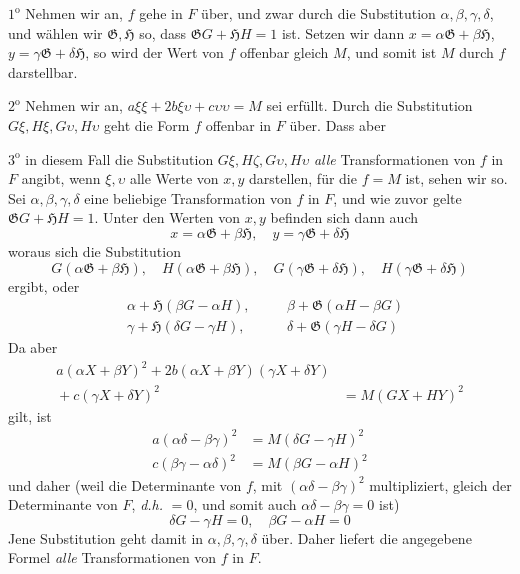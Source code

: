 $1^{\mathrm{o}}$ Nehmen wir an, $f$ gehe in $F$ über, und zwar durch die Substitution $\alpha,\beta,\gamma,\delta$, und wählen wir $\mathfrak{G},\mathfrak{H}$ so, dass $\mathfrak{G}G+\mathfrak{H}H=1$ ist. Setzen wir dann $x=\alpha\mathfrak{G}+\beta\mathfrak{H}$, $y=\gamma\mathfrak{G}+\delta\mathfrak{H}$, so wird der Wert von $f$ offenbar gleich $M$, und somit ist $M$ durch $f$ darstellbar.

$2^{\mathrm{o}}$ Nehmen wir an, $a\xi\xi+2b\xi\upsilon+c\upsilon\upsilon=M$ sei erfüllt. Durch die Substitution $G\xi,H\xi,G\upsilon,H\upsilon$ geht die Form $f$ offenbar in $F$ über. Dass aber

$3^{\mathrm{o}}$ in diesem Fall die Substitution $G\xi,H\zeta,G\upsilon,H\upsilon$ \textit{alle} Transformationen von $f$ in $F$ angibt, wenn $\xi,\upsilon$ alle Werte von $x,y$ darstellen, für die $f=M$ ist, sehen wir so. Sei $\alpha,\beta,\gamma,\delta$ eine beliebige Transformation von $f$ in $F$, und wie zuvor gelte $\mathfrak{G}G+\mathfrak{H}H=1$. Unter den Werten von $x,y$ befinden sich dann auch
\[
x=\alpha\mathfrak{G}+\beta\mathfrak{H},\quad y=\gamma\mathfrak{G}+\delta\mathfrak{H}
\]
woraus sich die Substitution
\[
G(\alpha\mathfrak{G}+\beta\mathfrak{H}),\quad H(\alpha\mathfrak{G}+\beta\mathfrak{H}),\quad G(\gamma\mathfrak{G}+\delta\mathfrak{H}),\quad H(\gamma\mathfrak{G}+\delta\mathfrak{H})
\]
ergibt, oder
\[
\begin{aligned}
&\alpha+\mathfrak{H}(\beta G-\alpha H), &\quad&\beta+\mathfrak{G}(\alpha H-\beta G)\\
&\gamma+\mathfrak{H}(\delta G-\gamma H), &&\delta+\mathfrak{G}(\gamma H-\delta G)
\end{aligned}
\]
Da aber
\[
\begin{aligned}a(\alpha X+\beta Y)^2+2b(\alpha X+\beta Y)(\gamma X+\delta Y)&{}\\
{}+c(\gamma X+\delta Y)^2&=M(GX+HY)^2\end{aligned}
\]
gilt, ist
\[
\begin{aligned}
a(\alpha\delta-\beta\gamma)^2&=M(\delta G-\gamma H)^2\\
c(\beta\gamma-\alpha\delta)^2&=M(\beta G-\alpha H)^2
\end{aligned}
\]
und daher (weil die Determinante von $f$, mit $(\alpha\delta-\beta\gamma)^2$ multipliziert, gleich der Determinante von $F$, \textit{d.h.} $=0$, und somit auch $\alpha\delta-\beta\gamma=0$ ist)
\[
\delta G-\gamma H=0,\quad \beta G-\alpha H=0
\]
Jene Substitution geht damit in $\alpha,\beta,\gamma,\delta$ über. Daher liefert die angegebene Formel \textit{alle} Transformationen von $f$ in $F$.

